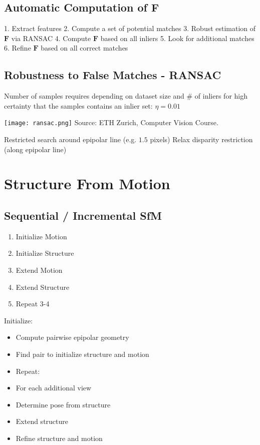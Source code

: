 \subsection{Automatic Computation of $\mathbf{F}$}
1. Extract features
2. Compute a set of potential matches
3. Robust estimation of $\mathbf{F}$ via RANSAC  
4. Compute $\mathbf{F}$ based on all inliers
5. Look for additional matches
6. Refine $\mathbf{F}$ based on all correct matches

\subsection{Robustness to False Matches - RANSAC}

Number of samples requires depending on dataset size and \# of inliers for high certainty that the samples contains an inlier set:
$\eta = 0.01$

\texttt{[image: ransac.png]}
Source: ETH Zurich, Computer Vision  Course.

Restricted search around epipolar line (e.g. $1.5$ pixels)
Relax disparity restriction (along epipolar line)

\section{Structure From Motion}
\subsection{Sequential / Incremental SfM}

\begin{enumerate}
\item  Initialize Motion
\item  Initialize Structure
\item  Extend Motion
\item  Extend Structure
\item Repeat 3-4
\end{enumerate}

Initialize:
\begin{itemize}
\item Compute pairwise epipolar geometry
\item Find pair to initialize structure and motion
\item Repeat:
\item For each additional view
\item Determine pose from structure 
\item Extend structure
\item Refine structure and motion
\end{itemize}

